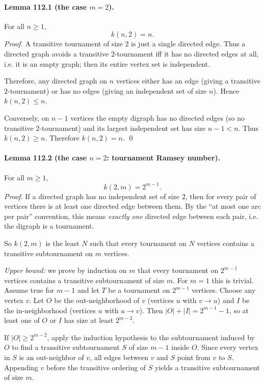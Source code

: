 \paragraph{Lemma 112.1 (the case $m=2$).}
For all $n\ge1$,
\[
 k(n,2)=n.
\]
\emph{Proof.}
A transitive tournament of size $2$ is just a single directed edge.  Thus a directed graph avoids a transitive $2$-tournament iff it has no directed edges at all, i.e. it is an empty graph; then its entire vertex set is independent.

Therefore, any directed graph on $n$ vertices either has an edge (giving a transitive $2$-tournament) or has no edges (giving an independent set of size $n$).  Hence $k(n,2)\le n$.

Conversely, on $n-1$ vertices the empty digraph has no directed edges (so no transitive $2$-tournament) and its largest independent set has size $n-1<n$.  Thus $k(n,2)\ge n$.  Therefore $k(n,2)=n$. \qed

\paragraph{Lemma 112.2 (the case $n=2$: tournament Ramsey number).}
For all $m\ge1$,
\[
 k(2,m)=2^{m-1}.
\]
\emph{Proof.}
If a directed graph has no independent set of size $2$, then for every pair of vertices there is at least one directed edge between them.  By the ``at most one arc per pair'' convention, this means \emph{exactly one} directed edge between each pair, i.e. the digraph is a tournament.

So $k(2,m)$ is the least $N$ such that every tournament on $N$ vertices contains a transitive subtournament on $m$ vertices.

\emph{Upper bound:} we prove by induction on $m$ that every tournament on $2^{m-1}$ vertices contains a transitive subtournament of size $m$.
For $m=1$ this is trivial.
Assume true for $m-1$ and let $T$ be a tournament on $2^{m-1}$ vertices.  Choose any vertex $v$.  Let $O$ be the out-neighborhood of $v$ (vertices $u$ with $v\to u$) and $I$ be the in-neighborhood (vertices $u$ with $u\to v$).  Then $|O|+|I|=2^{m-1}-1$, so at least one of $O$ or $I$ has size at least $2^{m-2}$.

If $|O|\ge 2^{m-2}$, apply the induction hypothesis to the subtournament induced by $O$ to find a transitive subtournament $S$ of size $m-1$ inside $O$.  Since every vertex in $S$ is an out-neighbor of $v$, all edges between $v$ and $S$ point from $v$ to $S$.  Appending $v$ before the transitive ordering of $S$ yields a transitive subtournament of size $m$.

